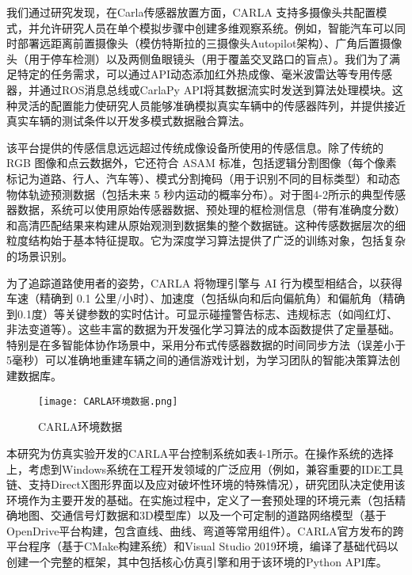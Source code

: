 我们通过研究发现，在Carla传感器放置方面，CARLA 支持多摄像头共配置模式，并允许研究人员在单个模拟步骤中创建多维观察系统。例如，智能汽车可以同时部署远距离前置摄像头（模仿特斯拉的三摄像头Autopilot架构）、广角后置摄像头（用于停车检测）以及两侧鱼眼镜头（用于覆盖交叉路口的盲点）。我们为了满足特定的任务需求，可以通过API动态添加红外热成像、毫米波雷达等专用传感器，并通过ROS消息总线或CarlaPy API将其数据流实时发送到算法处理模块。这种灵活的配置能力使研究人员能够准确模拟真实车辆中的传感器阵列，并提供接近真实车辆的测试条件以开发多模式数据融合算法。

该平台提供的传感信息远远超过传统成像设备所使用的传感信息。除了传统的 RGB 图像和点云数据外，它还符合 ASAM 标准，包括逻辑分割图像（每个像素标记为道路、行人、汽车等）、模式分割掩码（用于识别不同的目标类型）和动态物体轨迹预测数据（包括未来 5 秒内运动的概率分布）。对于图4-2所示的典型传感器数据，系统可以使用原始传感器数据、预处理的框检测信息（带有准确度分数）和高清匹配结果来构建从原始观测到数据集的整个数据链。这种传感数据层次的细粒度结构始于基本特征提取。它为深度学习算法提供了广泛的训练对象，包括复杂的场景识别。

为了追踪道路使用者的姿势，CARLA 将物理引擎与 AI 行为模型相结合，以获得车速（精确到 0.1 公里/小时）、加速度（包括纵向和后向偏航角）和偏航角（精确到0.1度）等关键参数的实时估计。可显示碰撞警告标志、违规标志（如闯红灯、非法变道等）。这些丰富的数据为开发强化学习算法的成本函数提供了定量基础。特别是在多智能体协作场景中，采用分布式传感器数据的时间同步方法（误差小于5毫秒）可以准确地重建车辆之间的通信游戏计划，为学习团队的智能决策算法创建数据库。

\begin{figure}[hbt]
	\centering
	\texttt{[image: CARLA环境数据.png]}
	\caption{CARLA环境数据}
	\label{f.example}
\end{figure}

本研究为仿真实验开发的CARLA平台控制系统如表4-1所示。在操作系统的选择上，考虑到Windows系统在工程开发领域的广泛应用（例如，兼容重要的IDE工具链、支持DirectX图形界面以及应对破坏性环境的特殊情况），研究团队决定使用该环境作为主要开发的基础。在实施过程中，定义了一套预处理的环境元素（包括精确地图、交通信号灯数据和3D模型库）以及一个可定制的道路网络模型（基于OpenDrive平台构建，包含直线、曲线、弯道等常用组件）。CARLA官方发布的跨平台程序（基于CMake构建系统）和Visual Studio 2019环境，编译了基础代码以创建一个完整的框架，其中包括核心仿真引擎和用于该环境的Python API库。

